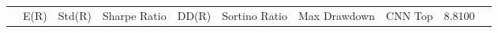 \begin{tabular}{lrrrrrrrrr}
 & E(R) & Std(R) & Sharpe Ratio & DD(R) & Sortino Ratio & Max Drawdown & %
CNN Top & 8.8100%
\end{tabular}
